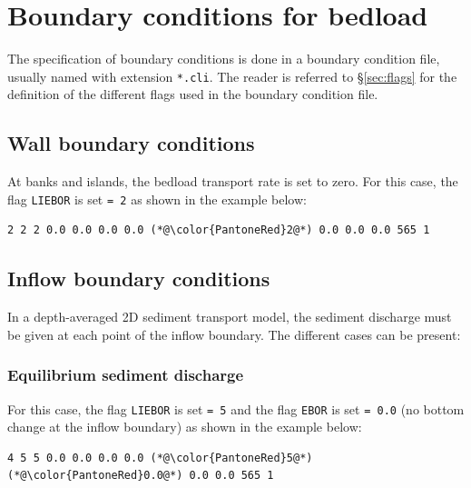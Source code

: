 \section{Boundary conditions for bedload}
The specification of boundary conditions is done in a boundary condition file, usually named with extension \texttt{*.cli}. The reader is referred to \S\ref{sec:flags} for the definition of the different flags used in the boundary condition file.

\subsection{Wall boundary conditions}
At banks and islands, the bedload transport rate is set to zero. For this case, the flag \texttt{LIEBOR} is set \texttt{= 2} as shown in the example below:

\begin{lstlisting}[frame=trBL]
2 2 2 0.0 0.0 0.0 0.0 (*@\color{PantoneRed}2@*) 0.0 0.0 0.0 565 1
\end{lstlisting}

\subsection{Inflow boundary conditions}
In a depth-averaged 2D sediment transport model, the sediment discharge must be given at each point of the inflow boundary. The different cases can be present:
\subsubsection{Equilibrium sediment discharge}
For this case, the flag \texttt{LIEBOR} is set \texttt{= 5} and the flag \texttt{EBOR} is set \texttt{= 0.0} (no bottom change at the inflow boundary) as shown in the example below:

\begin{lstlisting}[frame=trBL]
4 5 5 0.0 0.0 0.0 0.0 (*@\color{PantoneRed}5@*) (*@\color{PantoneRed}0.0@*) 0.0 0.0 565 1
\end{lstlisting}

